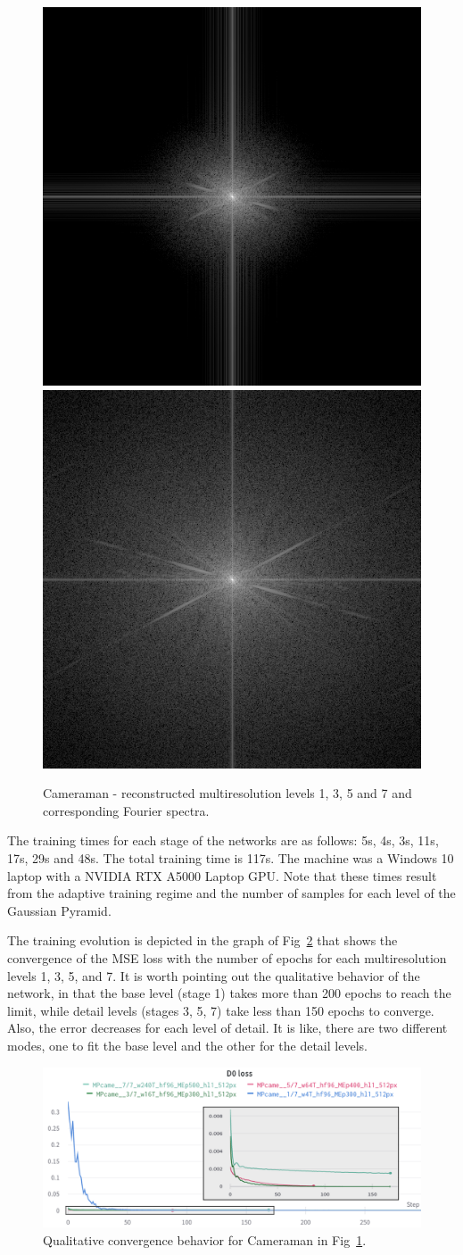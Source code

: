 \begin{figure}[!ht]
\includegraphics[width=0.20\linewidth]{img/ch5/5-fft.png}
\includegraphics[width=0.20\linewidth]{img/ch5/7-fft.png}
\caption{Cameraman - reconstructed multiresolution levels 1, 3, 5 and 7 and corresponding Fourier spectra.}
\label{f:lod}
\end{figure}

The training times for each stage of the networks are as follows: 5s, 4s, 3s, 11s, 17s, 29s and 48s. The total training time is 117s. The machine was a Windows 10 laptop with a NVIDIA RTX A5000 Laptop GPU. Note that these times result from the adaptive training regime and the number of samples for each level of the Gaussian Pyramid. 

The training evolution is depicted in the graph of Fig~\ref{f:training-epochs} that shows the convergence of the MSE loss with the number of epochs for each multiresolution levels 1, 3, 5, and 7. It is worth pointing out the qualitative behavior of the network, in that the base level (stage 1) takes more than 200 epochs to reach the limit, while detail levels (stages 3, 5, 7) take less than 150 epochs to converge. Also, the error decreases for each level of detail. It is like, there are two different modes, one to fit the base level and the other for the detail levels.

\begin{figure}[!h]
\centering
\includegraphics[width=\linewidth]{img/ch5/stages-training-epochs.png}
\caption{Qualitative convergence behavior for Cameraman in Fig~\ref{f:lod}.}
\label{f:training-epochs}
\end{figure}


